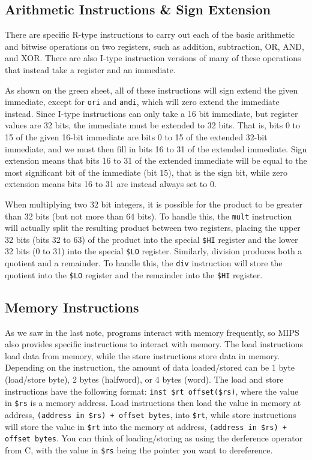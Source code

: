 \documentclass{article}
\begin{document}
\subsection{Arithmetic Instructions \& Sign Extension}
There are specific R-type instructions to carry out each of the basic arithmetic and bitwise operations on two registers, such as addition, subtraction, OR, AND, and XOR. There are also I-type instruction versions of many of these operations that instead take a register and an immediate. 

As shown on the green sheet, all of these instructions will sign extend the given immediate, except for \texttt{ori} and \texttt{andi}, which will zero extend the immediate instead. Since I-type instructions can only take a 16 bit immediate, but register values are 32 bits, the immediate must be extended to 32 bits. That is, bits 0 to 15 of the given 16-bit immediate are bits 0 to 15 of the extended 32-bit immediate, and we must then fill in bits 16 to 31 of the extended immediate. Sign extension means that bits 16 to 31 of the extended immediate will be equal to the most significant bit of the immediate (bit 15), that is the sign bit, while zero extension means bits 16 to 31 are instead always set to 0.

When multiplying two 32 bit integers, it is possible for the product to be greater than 32 bits (but not more than 64 bits). To handle this, the \texttt{mult} instruction will actually split the resulting product between two registers, placing the upper 32 bits (bits 32 to 63) of the product into the special \texttt{\$HI} register and the lower 32 bits (0 to 31) into the special \texttt{\$LO} register. Similarly, division produces both a quotient and a remainder. To handle this, the \texttt{div} instruction will store the quotient into the \texttt{\$LO} register and the remainder into the \texttt{\$HI} register.

\subsection{Memory Instructions}
As we saw in the last note, programs interact with memory frequently, so MIPS also provides specific instructions to interact with memory. The load instructions load data from memory, while the store instructions store data in memory. Depending on the instruction, the amount of data loaded/stored can be 1 byte (load/store byte), 2 bytes (halfword), or 4 bytes (word). The load and store instructions have the following format: \texttt{inst \$rt offset(\$rs)}, where the value in \texttt{\$rs} is a memory address. Load instructions then load the value in memory at address, \texttt{(address in \$rs) + offset bytes}, into \texttt{\$rt}, while store instructions will store the value in \texttt{\$rt} into the memory at address, \texttt{(address in \$rs) + offset bytes}. You can think of loading/storing as using the derference operator from C, with the value in \texttt{\$rs} being the pointer you want to dereference.
\end{document}
